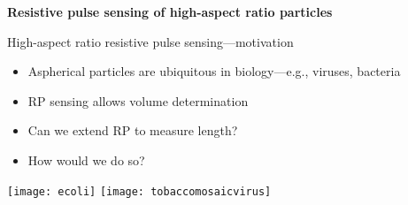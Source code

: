 

\begin{frame}[c]{}
	\begin{center}
		\textbf{Resistive pulse sensing of high-aspect ratio particles}
	\end{center}
\end{frame}






\begin{frame}[c]{High-aspect ratio resistive pulse sensing---motivation}
	\begin{itemize}
		\item Aspherical particles are ubiquitous in biology---e.g., viruses, bacteria 
		\item RP sensing allows volume determination
		\item Can we extend RP to measure length?
		\item How would we do so?
	\end{itemize}
	{\centering
		\texttt{[image: ecoli]}
		\hspace{1cm}
		\texttt{[image: tobaccomosaicvirus]}
		\par
	}
\end{frame}





